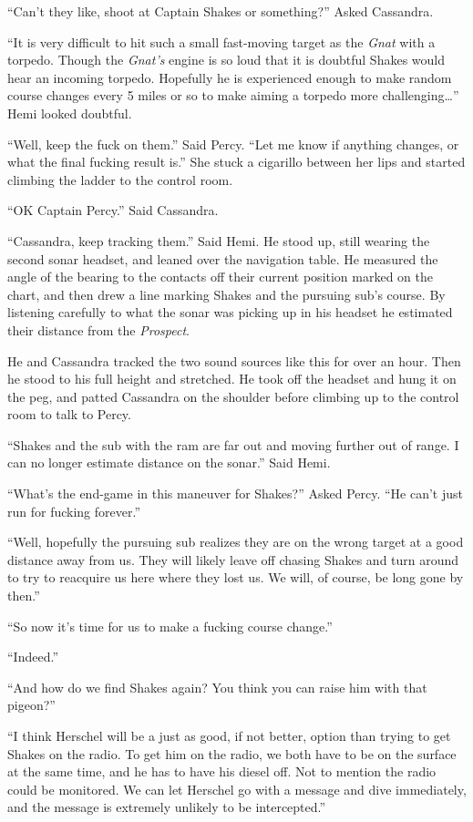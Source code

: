 \documentclass[
]{scrbook}
\begin{document}
``Can't they like, shoot at Captain Shakes or something?'' Asked
Cassandra.

``It is very difficult to hit such a small fast-moving target as the
\emph{Gnat} with a torpedo. Though the \emph{Gnat's} engine is so loud
that it is doubtful Shakes would hear an incoming torpedo. Hopefully he
is experienced enough to make random course changes every 5 miles or so
to make aiming a torpedo more challenging\ldots{}'' Hemi looked
doubtful.

``Well, keep the fuck on them.'' Said Percy. ``Let me know if anything
changes, or what the final fucking result is.'' She stuck a cigarillo
between her lips and started climbing the ladder to the control room.

``OK Captain Percy.'' Said Cassandra.

``Cassandra, keep tracking them.'' Said Hemi. He stood up, still wearing
the second sonar headset, and leaned over the navigation table. He
measured the angle of the bearing to the contacts off their current
position marked on the chart, and then drew a line marking Shakes and
the pursuing sub's course. By listening carefully to what the sonar was
picking up in his headset he estimated their distance from the
\emph{Prospect}.

He and Cassandra tracked the two sound sources like this for over an
hour. Then he stood to his full height and stretched. He took off the
headset and hung it on the peg, and patted Cassandra on the shoulder
before climbing up to the control room to talk to Percy.

``Shakes and the sub with the ram are far out and moving further out of
range. I can no longer estimate distance on the sonar.'' Said Hemi.

``What's the end-game in this maneuver for Shakes?'' Asked Percy. ``He
can't just run for fucking forever.''

``Well, hopefully the pursuing sub realizes they are on the wrong target
at a good distance away from us. They will likely leave off chasing
Shakes and turn around to try to reacquire us here where they lost us.
We will, of course, be long gone by then.''

``So now it's time for us to make a fucking course change.''

``Indeed.''

``And how do we find Shakes again? You think you can raise him with that
pigeon?''

``I think Herschel will be a just as good, if not better, option than
trying to get Shakes on the radio. To get him on the radio, we both have
to be on the surface at the same time, and he has to have his diesel
off. Not to mention the radio could be monitored. We can let Herschel go
with a message and dive immediately, and the message is extremely
unlikely to be intercepted.''
\end{document}
